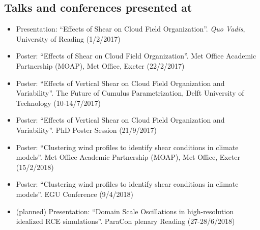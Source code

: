 \documentclass[11pt,a4paper]{article}
\begin{document}
\subsection*{Talks and conferences presented at}

\begin{itemize}
  \item Presentation: ``Effects of Shear on Cloud Field Organization''. \textit{Quo Vadis}, University of Reading (1/2/2017)
  \item Poster: ``Effects of Shear on Cloud Field Organization''. Met Office Academic Partnership (MOAP), Met Office, Exeter (22/2/2017)
  \item Poster: ``Effects of Vertical Shear on Cloud Field Organization and Variability''. The Future of Cumulus Parametrization, Delft University of Technology (10-14/7/2017)
  \item Poster: ``Effects of Vertical Shear on Cloud Field Organization and Variability''. PhD Poster Session (21/9/2017)
  \item Poster: ``Clustering wind profiles to identify shear conditions in climate models''. Met Office Academic Partnership (MOAP), Met Office, Exeter (15/2/2018)
  \item Poster: ``Clustering wind profiles to identify shear conditions in climate models''. EGU Conference (9/4/2018)
  \item (planned) Presentation: ``Domain Scale Oscillations in high-resolution idealized RCE simulations''. ParaCon plenary Reading (27-28/6/2018)
\end{itemize}
\end{document}

